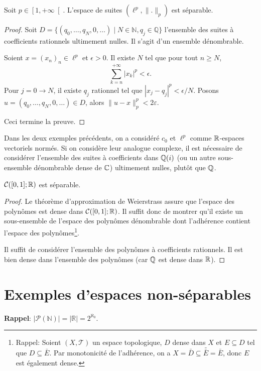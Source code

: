 \begin{ex}
  Soit $p \in \left[1, +\infty\right[$.
  L'espace de suites $(\ell^p, \|.\|_p)$ est séparable.
\end{ex}
\begin{proof}
  Soit $D = \{(q_0, \ldots, q_N, 0, \ldots)\mid
  N\in\mathbb N, q_j \in\mathbb Q\}$ l'ensemble des suites à coefficients
  rationnels ultimement nulles. Il s'agit d'un ensemble dénombrable.

  Soient $x = (x_n)_n\in \ell ^p$ et $\epsilon >0$. Il existe $N$ tel que
  pour tout $n \geq N$,
  $$\sum_{k=n}^{+\infty}|x_k|^p < \epsilon.$$
  Pour $j = 0 \to N$, il existe $q_j$ rationnel tel que
  $|x_j-q_j|^p<\epsilon/N$. Posons $u=(q_0, \ldots, q_N, 0, \ldots)\in D$, alors
  $\|u-x\|^p_p<2\varepsilon$.

  Ceci termine la preuve.
\end{proof}

\begin{rem}
  Dans les deux exemples précédents, on a considéré $c_0$ et $\ell^p$
  comme $\mathbb{R}$-espaces vectoriels normés. Si on considère leur analogue
  complexe, il est nécessaire de considérer l'ensemble des suites à
  coefficients dans $\mathbb{Q}(i)$ (ou un autre sous-ensemble dénombrable dense
  de $\mathbb{C}$) ultimement nulles, plutôt que $\mathbb{Q}$.
\end{rem}

\begin{ex}
  $\mathcal C([0, 1]; \mathbb{R})$ est séparable.
\end{ex}
\begin{proof}
  Le théorème d'approximation de Weierstrass assure que l'espace des polynômes
  est dense dans $\mathcal C([0, 1]; \mathbb{R})$. Il suffit donc de montrer qu'il
  existe un sous-ensemble de l'espace des polynômes dénombrable dont l'adhérence
  contient l'espace des polynômes\footnote{Rappel: Soient $(X, \mathcal T)$ un
    espace topologique, $D$ dense dans $X$ et $E\subseteq D$ tel
    que $D\subseteq \bar E$. Par monotonicité de l'adhérence, on a
    $X = \bar D \subseteq \bar{\bar E} =\bar E$, donc $E$ est également dense.}.

  Il suffit de considérer l'ensemble des polynômes à coefficients
  rationnels. Il est bien dense dans l'ensemble des polynômes (car $\mathbb{Q}$
  est dense dans $\mathbb{R}$).
\end{proof}
\section{Exemples d'espaces non-séparables}
\textbf{Rappel}: $|\mathcal P (\mathbb N)| = |\mathbb R| = 2^{\aleph_0}$.

